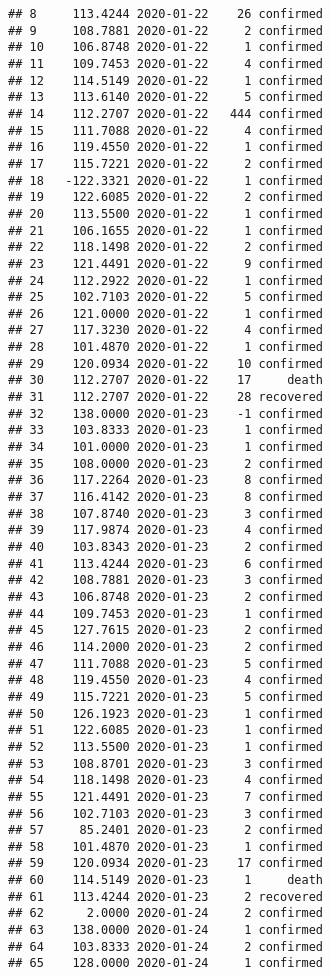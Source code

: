 \documentclass[
]{article}
\begin{document}
\begin{verbatim}
## 8     113.4244 2020-01-22    26 confirmed
## 9     108.7881 2020-01-22     2 confirmed
## 10    106.8748 2020-01-22     1 confirmed
## 11    109.7453 2020-01-22     4 confirmed
## 12    114.5149 2020-01-22     1 confirmed
## 13    113.6140 2020-01-22     5 confirmed
## 14    112.2707 2020-01-22   444 confirmed
## 15    111.7088 2020-01-22     4 confirmed
## 16    119.4550 2020-01-22     1 confirmed
## 17    115.7221 2020-01-22     2 confirmed
## 18   -122.3321 2020-01-22     1 confirmed
## 19    122.6085 2020-01-22     2 confirmed
## 20    113.5500 2020-01-22     1 confirmed
## 21    106.1655 2020-01-22     1 confirmed
## 22    118.1498 2020-01-22     2 confirmed
## 23    121.4491 2020-01-22     9 confirmed
## 24    112.2922 2020-01-22     1 confirmed
## 25    102.7103 2020-01-22     5 confirmed
## 26    121.0000 2020-01-22     1 confirmed
## 27    117.3230 2020-01-22     4 confirmed
## 28    101.4870 2020-01-22     1 confirmed
## 29    120.0934 2020-01-22    10 confirmed
## 30    112.2707 2020-01-22    17     death
## 31    112.2707 2020-01-22    28 recovered
## 32    138.0000 2020-01-23    -1 confirmed
## 33    103.8333 2020-01-23     1 confirmed
## 34    101.0000 2020-01-23     1 confirmed
## 35    108.0000 2020-01-23     2 confirmed
## 36    117.2264 2020-01-23     8 confirmed
## 37    116.4142 2020-01-23     8 confirmed
## 38    107.8740 2020-01-23     3 confirmed
## 39    117.9874 2020-01-23     4 confirmed
## 40    103.8343 2020-01-23     2 confirmed
## 41    113.4244 2020-01-23     6 confirmed
## 42    108.7881 2020-01-23     3 confirmed
## 43    106.8748 2020-01-23     2 confirmed
## 44    109.7453 2020-01-23     1 confirmed
## 45    127.7615 2020-01-23     2 confirmed
## 46    114.2000 2020-01-23     2 confirmed
## 47    111.7088 2020-01-23     5 confirmed
## 48    119.4550 2020-01-23     4 confirmed
## 49    115.7221 2020-01-23     5 confirmed
## 50    126.1923 2020-01-23     1 confirmed
## 51    122.6085 2020-01-23     1 confirmed
## 52    113.5500 2020-01-23     1 confirmed
## 53    108.8701 2020-01-23     3 confirmed
## 54    118.1498 2020-01-23     4 confirmed
## 55    121.4491 2020-01-23     7 confirmed
## 56    102.7103 2020-01-23     3 confirmed
## 57     85.2401 2020-01-23     2 confirmed
## 58    101.4870 2020-01-23     1 confirmed
## 59    120.0934 2020-01-23    17 confirmed
## 60    114.5149 2020-01-23     1     death
## 61    113.4244 2020-01-23     2 recovered
## 62      2.0000 2020-01-24     2 confirmed
## 63    138.0000 2020-01-24     1 confirmed
## 64    103.8333 2020-01-24     2 confirmed
## 65    128.0000 2020-01-24     1 confirmed

\end{verbatim}
\end{document}
